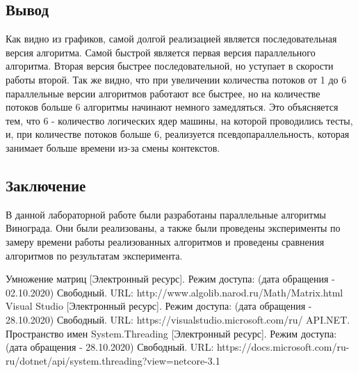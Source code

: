 \documentclass{article}
\begin{document}
	\subsection{Вывод}
	Как видно из графиков, самой долгой реализацией является последовательная версия алгоритма. 
	Самой быстрой является первая версия параллельного алгоритма. Вторая версия быстрее 
	последовательной, но уступает в скорости работы второй.
	\newline
	\indent Так же видно, что при увеличении количества потоков от 1 до 6 параллельные версии алгоритмов работают все быстрее, но на количестве потоков больше 6 алгоритмы начинают немного замедляться. Это объясняется тем, что 6 - количество логических ядер машины, на которой проводились тесты, и, при количестве потоков больше 6, реализуется псевдопараллельность, которая занимает больше времени из-за смены контекстов.

	\newpage
	\begin{center}
		\section*{Заключение}
	\end{center}
	\indent \indent В данной лабораторной работе были разработаны параллельные алгоритмы Винограда. Они были реализованы, а также были проведены эксперименты по замеру времени работы реализованных алгоритмов и проведены сравнения алгоритмов по результатам эксперимента.
	\newpage
	
	\begin{center}
	\begin{thebibliography}{3}
	Умножение матриц [Электронный ресурс]. Режим доступа: (дата обращения - 02.10.2020) Свободный. URL: http://www.algolib.narod.ru/Math/Matrix.html
	Visual Studio [Электронный ресурс]. Режим доступа: (дата обращения - 28.10.2020) Свободный. URL: https://visualstudio.microsoft.com/ru/
	API.NET. Пространство имен System.Threading [Электронный ресурс]. Режим доступа: (дата обращения - 28.10.2020) Свободный. URL: https://docs.microsoft.com/ru-ru/dotnet/api/system.threading?view=netcore-3.1

	\end{thebibliography}
	\end{center}
\end{document}

